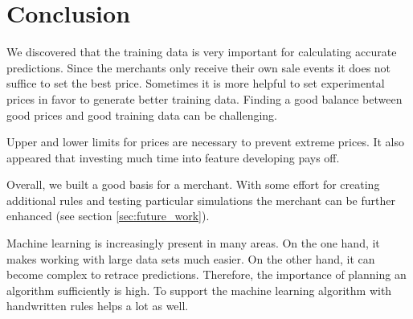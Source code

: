 \section{Conclusion}

We discovered that the training data is very important for calculating accurate predictions. Since the merchants only receive their own sale events it does not suffice to set the best price. Sometimes it is more helpful to set experimental prices in favor to generate better training data. Finding a good balance between good prices and good training data can be challenging.

Upper and lower limits for prices are necessary to prevent extreme prices. It also appeared that investing much time into feature developing pays off.

Overall, we built a good basis for a merchant. With some effort for creating additional rules and testing particular simulations the merchant can be further enhanced (see section \ref{sec:future_work}).

Machine learning is increasingly present in many areas. On the one hand, it makes working with large data sets much easier. On the other hand, it can become complex to retrace predictions. Therefore, the importance of planning an algorithm sufficiently is high. To support the machine learning algorithm with handwritten rules helps a lot as well.
